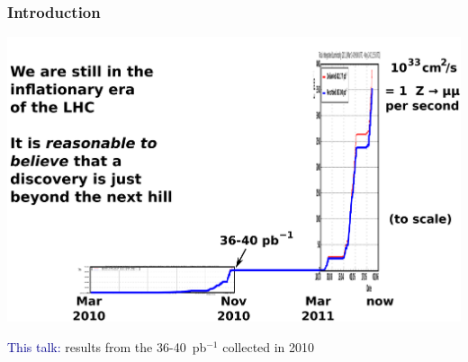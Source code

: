 \documentclass[compress]{beamer}
\begin{document}
\begin{frame}
\frametitle{Introduction}

\vspace{-0.5 cm}
\begin{center}
\includegraphics[width=\linewidth]{totallumivstime.pdf}
\end{center}

\textcolor{darkblue}{This talk:} results from the 36-40~pb$^{-1}$ collected in 2010
\end{frame}
\end{document}
